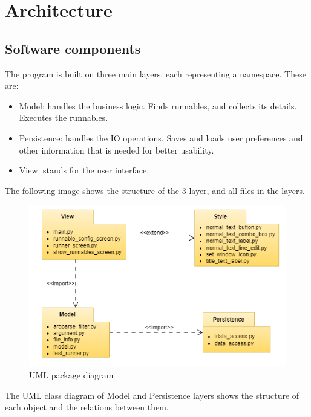 \documentclass{article}
\begin{document}
\newpage
\section{Architecture}

\subsection{Software components}

The program is built on three main layers, each representing a namespace. These are:

\begin{itemize}
    \item Model: handles the business logic. Finds runnables, and collects its details. Executes the runnables.
    \item Persistence: handles the IO operations. Saves and loads user preferences and other information that is needed for better usability.
    \item View: stands for the user interface.
\end{itemize}

The following image shows the structure of the 3 layer, and all files in the layers. 

\begin{figure}[h]
    \centering
    \includegraphics[width=1\linewidth]{img/package_diagram.drawio.png}
    \caption{UML package diagram}
    \label{fig:enter-label}
\end{figure}

The UML class diagram of Model and Persistence layers shows the structure of each object and the relations between them.
\end{document}
